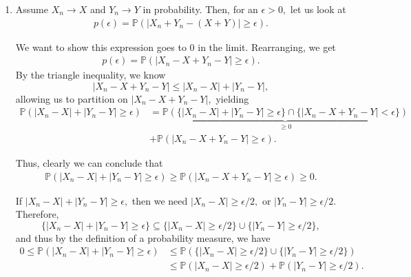 \documentclass[12pt]{article}
\begin{document}
\begin{enumerate}
    Apply Cauchy--Schwarz to $|(X_n  -X) + (Y_n - Y)|,$ yielding
    $$
    |(X_n - X) + (Y_n - Y)| \leq \sqrt{2} \cdot \sqrt{|X_n - X|^2 + |Y_n - Y|^2},
    $$
    or equivalently, $$
    |(X_n - X) + (Y_n - Y)|^2 \leq 2(|X_n - X|^2 + |Y_n - Y|^2).
    $$
    Therefore,
    \begin{align*}
      0 \leq \mathbb E[|X_n - X + Y_n - Y|^2] \leq 2 \mathbb E[|X_n - X|^2] + 2 \mathbb E[|Y_n - Y|^2],
    \end{align*}
    meaning by the squeeze theorem, we get
    \begin{align*}
      \lim_{n \to \infty} \mathbb E[|X_n + Y_n - (X + Y)|^2] = 0,
    \end{align*}
    and hence $X_n + Y_n \to X + Y$ in mean square, as required. \qed

  \item Assume $X_n \to X$ and $Y_n \to Y$ in probability. Then, for an $\epsilon > 0,$ let us look at
    \begin{align*}
      p(\epsilon) = \mathbb P(|X_n + Y_n - (X + Y)| \geq \epsilon).
    \end{align*}

    We want to show this expression goes to $0$ in the limit. Rearranging, we get
    \begin{align*}
      p(\epsilon) = \mathbb P(|X_n - X + Y_n - Y| \geq \epsilon).
    \end{align*}
    By the triangle inequality, we know $$|X_n - X + Y_n - Y| \leq |X_n - X| + |Y_n - Y|,$$ allowing us to partition on $|X_n -X + Y_n - Y|,$ yielding
    \begin{align*}
      \mathbb P(|X_n - X| + |Y_n - Y| \geq \epsilon) &= \underbrace{\mathbb P(\{|X_n - X| + |Y_n - Y| \geq \epsilon \} \cap \{|X_n - X + Y_n - Y| < \epsilon\})}_{\geq 0} \\
      &+ \mathbb P(|X_n - X + Y_n - Y| \geq \epsilon).
    \end{align*}

    Thus, clearly we can conclude that
    \begin{align*}
      \mathbb P(|X_n - X| + |Y_n - Y| \geq \epsilon) \geq \mathbb P(|X_n - X + Y_n - Y| \geq \epsilon) \geq 0.
    \end{align*}

    If $|X_n - X| + |Y_n - Y| \geq \epsilon,$ then we need $|X_n - X| \geq \epsilon /2 ,$ or $|Y_n - Y| \geq \epsilon / 2.$ Therefore, $$
    \{|X_n - X| + |Y_n - Y| \geq \epsilon \} \subseteq \{|X_n - X| \geq \epsilon /2\} \cup \{ |Y_n - Y| \geq \epsilon /2\},
    $$
    and thus by the definition of a probability measure, we have
    \begin{align*}
      0 \leq \mathbb P(|X_n - X| + |Y_n - Y| \geq \epsilon) &\leq \mathbb P(\{|X_n - X| \geq \epsilon / 2\} \cup \{|Y_n - Y| \geq \epsilon / 2\}) \\
      &\leq \mathbb P(|X_n - X| \geq \epsilon / 2) + \mathbb P(|Y_n - Y| \geq \epsilon /2).
    \end{align*}


\end{enumerate}
\end{document}

